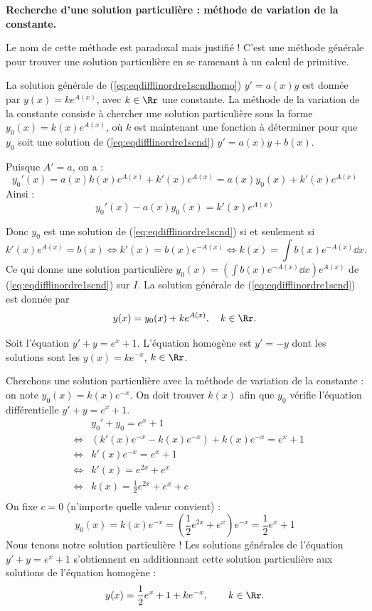 \documentclass[class=report,crop=false]{standalone}
\begin{document}
\textbf{Recherche d'une solution particulière : méthode de variation de la constante.}

Le nom de cette méthode est paradoxal mais justifié !
C'est une méthode générale pour trouver une solution
particulière en se ramenant à un calcul de primitive.

La solution générale de (\ref{eq:eqdifflinordre1scndhomo}) $y' = a(x) y$ est donnée
par $y(x)=ke^{A(x)}$, avec $k\in \Rr$ une constante.
La méthode de la variation de la constante consiste à chercher
une solution particulière sous la forme $y_0(x)=k(x)e^{A(x)}$,
où $k$ est maintenant une fonction à déterminer pour que
$y_0$ soit une solution de (\ref{eq:eqdifflinordre1scnd}) $y' = a(x) y  + b(x)$.

Puisque $A'=a$, on a :
$$y_0'(x)=a(x)k(x)e^{A(x)} + k'(x)e^{A(x)}= a(x)y_0(x) + k'(x)e^{A(x)}$$
Ainsi :
$$y_0'(x) - a(x)y_0(x) = k'(x)e^{A(x)}$$

Donc $y_0$ est une solution de (\ref{eq:eqdifflinordre1scnd}) si et seulement si
$$k'(x)e^{A(x)}=b(x) \iff k'(x)=b(x)e^{-A(x)} \iff k(x)=\int b(x)e^{-A(x)}\dd x.$$
Ce qui donne une solution particulière
$y_0(x) = \left(\int b(x)e^{-A(x)}\dd x \right)e^{A(x)}$ de (\ref{eq:eqdifflinordre1scnd})
sur $I$.
La solution générale de  (\ref{eq:eqdifflinordre1scnd}) est donnée par
$$y(x) = y_0(x) + ke^{A(x)}, \quad k\in \Rr.$$


\begin{exemple}
\label{ex:eqdifflinordre1scnd}
Soit l'équation $y'+y = e^x+1$.
L'équation homogène est $y'=-y$ dont les solutions sont
les $y(x) = k e^{-x}$, $k\in\Rr$.

Cherchons une solution particulière avec la méthode de variation de la constante :
on note $y_0(x) = k(x) e^{-x}$. On doit trouver $k(x)$ afin que $y_0$ vérifie l'équation
différentielle $y'+y = e^x+1$.
$$\begin{array}{rcl}
        && y_0'+y_0 = e^x+1  \\
 & \iff & \left(k'(x) e^{-x} - k(x) e^{-x} \right) + k(x) e^{-x} = e^x+1 \\
 & \iff & k'(x)e^{-x} = e^x+1 \\
 & \iff & k'(x) = e^{2x}+e^x \\
 & \iff & k(x) = \frac12e^{2x}+e^x + c \\
\end{array}$$
On fixe $c=0$ (n'importe quelle valeur convient) :
$$y_0(x) =  k(x) e^{-x} = \left(\frac12e^{2x}+e^x\right)e^{-x} = \frac12e^{x}+1$$
Nous tenons notre solution particulière ! Les solutions générales de l'équation
$y'+y = e^x+1$ s'obtiennent en additionnant cette solution particulière aux solutions
de l'équation homogène :
$$y(x) = \frac12e^{x}+1 + k e^{-x}, \qquad k\in\Rr.$$
\end{exemple}
\end{document}
